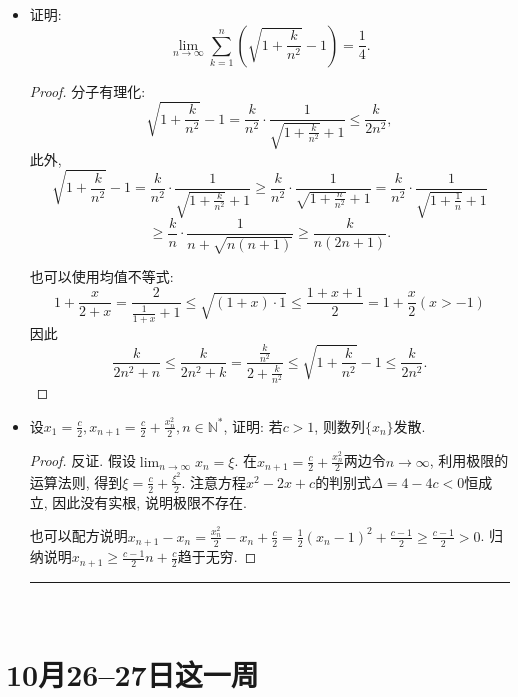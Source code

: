 \documentclass[UTF8,11pt, a4paper, oneside, fontset=none]{ctexbook}
\begin{document}
\begin{itemize}
\begin{proof}
\end{proof}


\item[6.]
证明:
\[
\lim_{n \to \infty} \sum_{k=1}^n \left( \sqrt{1 + \frac{k}{n^2} } -1\right) = \frac{1}{4}.
\]

\begin{proof}

分子有理化:
\[
\sqrt{1 + \frac{k}{n^2} } -1 = \frac{k}{n^2} \cdot \frac{1}{\sqrt{1 + \frac{k}{n^2} } +1} \leq \frac{k}{2n^2},
\]
此外, 
\[
\sqrt{1 + \frac{k}{n^2} } -1 = \frac{k}{n^2} \cdot \frac{1}{\sqrt{1 + \frac{k}{n^2} } +1} \geq \frac{k}{n^2} \cdot \frac{1}{\sqrt{1 + \frac{n}{n^2} } +1} = \frac{k}{n^2} \cdot \frac{1}{\sqrt{1 + \frac{1}{n} } +1} \]
\[
\geq \frac{k}{n} \cdot \frac{1}{n + \sqrt{n(n+1)}} \geq \frac{k}{n(2n+1)}.
\]


也可以使用均值不等式:
\[
1 + \frac{x}{2+x}= \frac{2}{\frac{1}{1+x}+1} \leq \sqrt{(1+x) \cdot 1} \leq \frac{1+x +1}{2} = 1 + \frac{x}{2} (x >-1)
\]
因此
\[
\frac{k}{2n^2 +n}\leq \frac{k}{2n^2 +k}= \frac{\frac{k}{n^2}}{2 + \frac{k}{n^2}} \leq \sqrt{1 + \frac{k}{n^2} } -1 \leq \frac{k}{2n^2}.
\]


\end{proof}

\item[7.] 设$x_
1 = \frac{c}{2}, x_{n+1} = \frac{c}{2} + \frac{x_n^2}{2}, n \in \mathbb N^*$, 证明: 若$c>1$, 则数列$\{x_n \}$发散.

\begin{proof}

反证. 假设$\lim_{n \to \infty}x_n = \xi$. 在$x_{n+1} = \frac{c}{2} + \frac{x_n^2}{2}$两边令$n \to \infty$, 利用极限的运算法则, 得到$\xi = \frac{c}{2} + \frac{\xi^2}{2}$. 注意方程$x^2-2x+c$的判别式$\Delta = 4-4c<0$恒成立, 因此没有实根, 说明极限不存在. 


也可以配方说明$x_{n+1} - x_n = \frac{x_n^2}{2} - x_n + \frac{c}{2}  = \frac{1}{2} (x_n -1)^2 + \frac{c-1}{2} \geq \frac{c-1}{2} >0$. 归纳说明$x_{n+1} \geq \frac{c-1}{2}n + \frac{c}{2} $趋于无穷.

\end{proof}


\hrule
\
\end{itemize}

\clearpage

\section{10月26--27日这一周}
\end{document}
